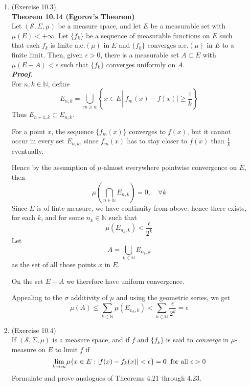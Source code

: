 \documentclass[a4paper,11pt]{article}
\begin{document}
\begin{enumerate}
\begin{enumerate}
		\end{enumerate}


	\item (Exercise 10.3)\\
		\textbf{Theorem 10.14 (Egorov’s Theorem)}\\
			Let $(\mathscr{S}, \Sigma, \mu)$ be a measure space, and let $E$ be a measurable set with $\mu(E) < +\infty$. Let $\{f_k\}$ be a sequence of measurable functions on $E$ such that each $f_k$ is finite a.e.$(\mu)$ in $E$ and $\{f_k\}$ converges a.e.$(\mu)$ in $E$ to a finite limit. Then, given $\epsilon > 0$, there is a measurable set $A \subset E$ with $\mu(E - A) < \epsilon$ such that $\{f_k\}$ converges uniformly on $A$.\\
	\newline
	\textit{\textbf {Proof.}}\\
		For $n, k \in \mathbb{N}$, define
			$$E_{n,k} = \underset{m \geq n}{\bigcup} \left\{ x \in E \left| |f_m(x) - f(x)| \geq \frac{1}{k}\right.\right\}$$
		Thus $E_{n+1,k} \subset E_{n,k}$.\

		For a point $x$, the sequence $\{f_m(x)\}$ converges to $f(x)$, but it cannot occur in every set $E_{n,k}$, since $f_m(x)$ has to stay closer to $f(x)$ than $\frac{1}{k}$ eventually.\

		Hence by the assumption of $\mu$-almost everywhere pointwise convergence on $E$, then
			$$\mu \left( \underset{n \in \mathbb{N}}{\bigcap} E_{n,k} \right) = 0, \quad \forall k$$
		Since $E$ is of finte measure, we have continuity from above; hence there exists, for each $k$, and for some $n_k \in \mathbb{N}$ such that
			$$\mu(E_{n_k, k}) < \frac{\epsilon}{2^k}$$
		Let
			$$A = \underset{k \in \mathbb{N}}{\bigcup} E_{n_k,k}$$
		as the set of all those points $x$ in $E$.\

		On the set $E - A$ we therefore have uniform convergence.\

		Appealing to the $\sigma$ additivity of $\mu$ and using the geometric series, we get
			$$\mu(A) \leq \underset{k \in \mathbb{N}}{\sum} \mu(E_{n_k, k}) < \underset{k \in \mathbb{N}}{\sum} \frac{\epsilon}{2^k} = \epsilon$$


	\item (Exercise 10.4)\\
		If $(\mathscr{S}, \Sigma, \mu)$ is a measure space, and if $f$ and $\{f_k\}$ is said to \textit{converge} in $\mu$-measure on $E$ to limit $f$ if
			$$\underset{k \to \infty}{\lim} \mu \{ x \in E : |f(x) - f_k(x)| < \epsilon \} = 0 \hspace{0.2cm} \text{for all $\epsilon > 0$}$$
		Formulate and prove analogues of Theorems 4.21 through 4.23.


\end{enumerate}
\end{document}
